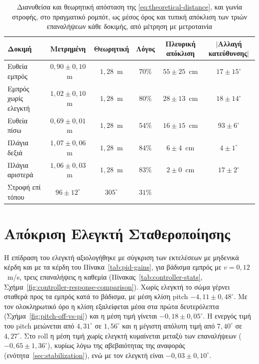 \documentclass[11pt]{report}
\begin{document}
\begin{table}[htbp]
    \centering
    \small
    \begin{tabular}{@{}l c c c c c@{}}
        \toprule
        Δοκιμή & Μετρημένη & Θεωρητική & Λόγος & Πλευρική απόκλιση & $|$Αλλαγή κατεύθυνσης$|$ \\
        \midrule
        Ευθεία εμπρός & $0{,}90 \pm 0{,}10$~m & $1{,}28$~m & $70\%$ & $55 \pm 25$~cm & $17 \pm 15^\circ$ \\
        Εμπρός χωρίς ελεγκτή & $1{,}02 \pm 0{,}10$~m & $1{,}28$~m & $80\%$ & $28 \pm 13$~cm & $18 \pm 14^\circ$ \\
        Ευθεία πίσω & $0{,}69 \pm 0{,}01$~m & $1{,}28$~m & $54\%$ & $16 \pm 15$~cm & $93 \pm 6^\circ$ \\
        Πλάγια δεξιά & $1{,}07 \pm 0{,}06$~m & $1{,}28$~m & $84\%$ & $6 \pm 4$~cm & $4 \pm 1^\circ$ \\
        Πλάγια αριστερά & $1{,}06 \pm 0{,}03$~m & $1{,}28$~m & $83\%$ & $2 \pm 0$~cm & $17 \pm 2^\circ$ \\
        Στροφή επί τόπου & $96 \pm 12^\circ$ & $305^\circ$ & $31\%$ & & \\
        \bottomrule
    \end{tabular}
    \caption[Διανυθείσα απόσταση και γωνία στροφής στο ρομπότ]{Διανυθείσα και
    θεωρητική απόσταση της \eqref{eq:theoretical-distance}, και γωνία στροφής,
    στο πραγματικό ρομπότ, ως μέσος όρος και τυπική απόκλιση των τριών
    επαναλήψεων κάθε δοκιμής, από μέτρηση με μετροταινία}
    \label{tab:final-distance}
\end{table}

\section{Απόκριση Ελεγκτή Σταθεροποίησης}
\label{sec:controller-results}
Η επίδραση του ελεγκτή αξιολογήθηκε με σύγκριση των εκτελέσεων με μηδενικά κέρδη
και με τα κέρδη του Πίνακα~\ref{tab:pid-gains}, για βάδισμα εμπρός με
$v = 0{,}12$~m/s, τρεις επαναλήψεις η καθεμία
(Πίνακας~\ref{tab:controller-stats},
Σχήμα~\ref{fig:controller-response-comparison}). Χωρίς ελεγκτή το σώμα γέρνει
σταθερά προς τα εμπρός κατά το βάδισμα, με μέση κλίση pitch
$-4{,}11 \pm 0{,}48^\circ$. Με τον ολοκληρωτικό όρο η κλίση εξαλείφεται μέσα
στα πρώτα δευτερόλεπτα (Σχήμα~\ref{fig:pitch-off-vs-pi}) και η μέση τιμή γίνεται
$-0{,}18 \pm 0{,}05^\circ$. Η ενεργός τιμή του pitch μειώνεται από $4{,}31^\circ$
σε $1{,}56^\circ$ και η μέγιστη απόλυτη τιμή από $7{,}40^\circ$ σε
$4{,}27^\circ$. Στο roll η μέση τιμή χωρίς ελεγκτή κυμαίνεται μεταξύ των
επαναλήψεων ($-0{,}65 \pm 1{,}36^\circ$), κυρίως λόγω της αβεβαιότητας της
αναφοράς (ενότητα~\ref{sec:stabilization}), ενώ με τον ελεγκτή είναι
$-0{,}03 \pm 0{,}10^\circ$.
\end{document}
